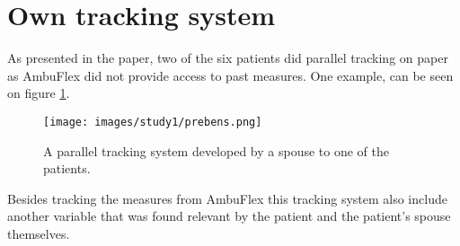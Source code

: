 \section{Own tracking system}
As presented in the paper, two of the six patients did parallel tracking on paper as AmbuFlex did not provide access to past measures. One example, can be seen on figure \ref{fig:paperSystem}.

\begin{figure}[h]
\centering
\texttt{[image: images/study1/prebens.png]}
\caption{A parallel tracking system developed by a spouse to one of the patients.}
\label{fig:paperSystem}
\end{figure}

Besides tracking the measures from AmbuFlex this tracking system also include another variable that was found relevant by the patient and the patient's spouse themselves.

%